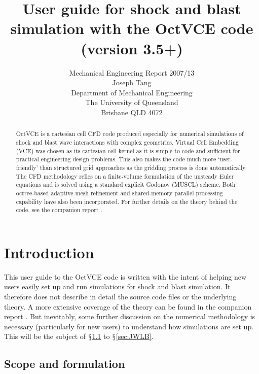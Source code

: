 \documentclass[pdftex, 12pt, a4paper]{report}
\begin{document}

\title{User guide for shock and blast simulation with the OctVCE code (version 3.5+)}
\author{
Mechanical Engineering Report 2007/13 \\
Joseph Tang \\
Department of Mechanical Engineering \\
The University of Queensland \\
Brisbane QLD 4072}
\maketitle

\begin{abstract}
OctVCE is a cartesian cell CFD code produced especially for numerical simulations of shock and blast wave interactions
with complex geometries.  Virtual Cell Embedding (VCE) was chosen as its cartesian cell kernel as it is simple to code and
sufficient for practical engineering design problems.  This also makes the code much more `user-friendly' than structured
grid approaches as the gridding process is done automatically.  The CFD methodology
relies on a finite-volume formulation of the unsteady Euler equations and is solved using a standard explicit Godonov (MUSCL) scheme.
Both octree-based adaptive mesh refinement and shared-memory parallel processing capability have also been incorporated.  For further
details on the theory behind the code, see the companion report \cite{Tang:tm}.  
\end{abstract}

\tableofcontents
\listoffigures

\chapter{Introduction}\label{sec:int}

This user guide to the OctVCE code is written with the intent of helping new users easily set up and run simulations
for shock and blast simulation.  It therefore does not describe in detail the source code files or the underlying theory.
A more extensive coverage of the theory can be found in the companion report \cite{Tang:tm}.  But 
inevitably, some further discussion on the numerical methodology is necessary (particularly for new users) to understand how 
simulations are set up.  This will be the subject of $\mathsection$\ref{sec:method} to $\mathsection$\ref{sec:JWLB}.

\section{Scope and formulation}\label{sec:method}
\end{document}
